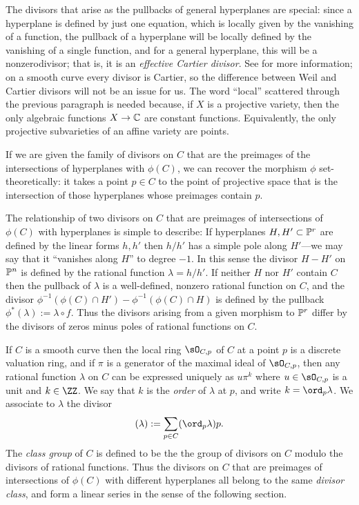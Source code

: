 The divisors that arise as the pullbacks of general hyperplanes are special: since a hyperplane is defined by just one equation, which is locally given by the vanishing of a function, the pullback of a hyperplane will be locally defined by the vanishing of a single function,
and for a general hyperplane, this will be a nonzerodivisor; that is, it is an  \emph{effective Cartier divisor}. See \cite[pp. 140-146]{H} for more information; on a smooth curve every divisor is Cartier, so the difference between Weil and Cartier divisors will not be an issue for us.
The  word ``local'' scattered through the previous paragraph is needed because, if $X$ is a projective variety, then the only algebraic functions $X\to \CC$ are constant functions. Equivalently, the only projective subvarieties of an affine variety are points.

If we are given the family of divisors on $C$ that are the preimages of the intersections of hyperplanes with  $\phi(C)$, we can recover the morphism $\phi$ set-theoretically: it takes a point $p\in C$ to the point of projective space that is the intersection of those
hyperplanes whose preimages contain $p$. 

The relationship of two divisors on $C$ that are preimages of intersections of $\phi(C)$ with hyperplanes is simple to describe: If hyperplanes
$H, H'\subset \PP^r$ are defined by the linear forms $h, h'$  then $h/h'$ has a simple pole along $H'$---we may say that it ``vanishes along $H$'' to degree $-1$.
In this sense the divisor $H-H'$ on $\PP^n$ is defined by the rational function $\lambda= h/h'$. If neither $H$ nor $H'$ contain $C$ then the pullback of $\lambda$ is a well-defined, nonzero rational function on $C$, and the divisor 
$\phi^{-1}(\phi(C)\cap H') - \phi^{-1}(\phi(C)\cap H)$ is defined by the pullback  $\phi^*(\lambda) := \lambda \circ f$. Thus the divisors arising from a given morphism to $\PP^{r}$ differ by the divisors of zeros minus poles of rational functions on $C$. 

If $C$ is a smooth curve then the local ring $\sO_{C,p}$ of $C$ at a point $p$ is a discrete valuation ring, and if $\pi$ is a generator of the maximal ideal of $\sO_{C,p}$, then any rational
function $\lambda$ on $C$ can be expressed uniquely as $u\pi^k$ where $u\in \sO_{C,p}$ is a unit and $k\in \ZZ$. We say that $k$ is
the \emph{order} of $\lambda$ at $p$, and write $k = \ord_p \lambda$. We associate to $\lambda$  the divisor
$$
(\lambda) := \sum_{p\in C} (\ord_p\lambda)p.
$$
The \emph{class group} of $C$ is defined to be the the group of divisors on $C$ modulo the divisors of rational functions.
Thus the divisors on $C$ that are preimages of intersections of $\phi(C)$ with different hyperplanes all belong to the same
\emph{divisor class}, and form a linear series in the sense of the following section.

